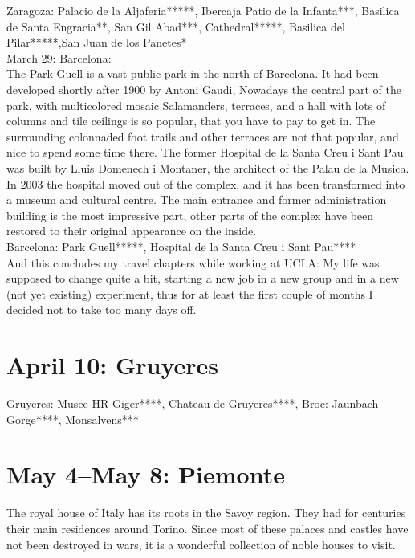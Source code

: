 Zaragoza: Palacio de la Aljaferia*****, Ibercaja Patio de la Infanta***, Basilica de Santa Engracia**, San Gil Abad***, Cathedral*****, Basilica del Pilar*****,San Juan de los Panetes*\\

March 29: Barcelona:\\
The Park Guell is a vast public park in the north of Barcelona. It had been developed shortly after 1900 by Antoni Gaudi, Nowadays the central part of the park, with multicolored mosaic Salamanders, terraces, and a hall with lots of columns and tile ceilings is so popular, that you have to pay to get in. The surrounding colonnaded foot trails and other terraces are not that popular, and nice to spend some time there. The former Hospital de la Santa Creu i Sant Pau was built by Lluis Domenech i Montaner, the architect of the Palau de la Musica. In 2003 the hospital moved out of the complex, and it has been transformed into a museum and cultural centre. The main entrance and former administration building is the most impressive part, other parts of the complex have been restored to their original appearance on the inside.\\

Barcelona: Park Guell*****, Hospital de la Santa Creu i Sant Pau****\\

And this concludes my travel chapters while working at UCLA: My life was supposed to change quite a bit, starting a new job in a new group and in a new (not yet existing) experiment, thus for at least the first couple of months I decided not to take too many days off.\\

\section{April 10: Gruyeres}
\label{2016Gruyeres}

Gruyeres: Musee HR Giger****, Chateau de Gruyeres****, Broc: Jaunbach Gorge****, Monsalvens***

\section{May 4--May 8: Piemonte}

The royal house of Italy has its roots in the Savoy region. They had for centuries their main residences around Torino. Since most of these palaces and castles have not been destroyed in wars, it is a wonderful collection of noble houses to visit.\\

